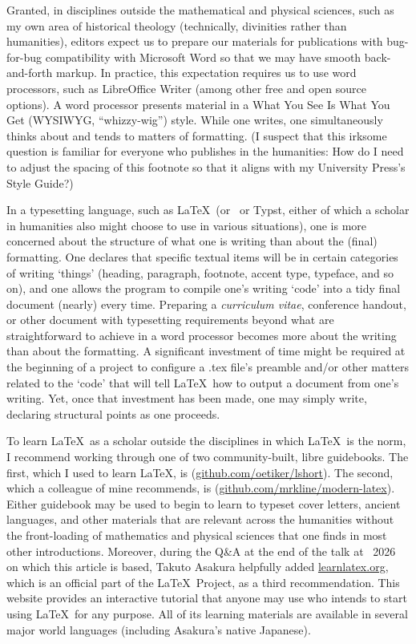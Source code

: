 \documentclass{ltugboat}
\begin{document}
Granted, in disciplines outside the mathematical and physical sciences, such as my own area of historical theology (technically, divinities rather than humanities), editors expect us to prepare our materials for publications with bug-for-bug compatibility with Microsoft Word so that we may have smooth back-and-forth markup. In practice, this expectation requires us to use word processors, such as LibreOffice Writer (among other free and open source options). A word processor presents material in a What You See Is What You Get (WYSIWYG, ``whizzy-wig'') style. While one writes, one simultaneously thinks about and tends to matters of formatting. (I suspect that this irksome question is familiar for everyone who publishes in the humanities: How do I need to adjust the spacing of this footnote so that it aligns with my University Press's Style Guide?)

In a typesetting language, such as \LaTeX\ (or \ConTeXt\ or Typst, either of which a scholar in humanities also might choose to use in various situations), one is more concerned about the structure of what one is writing than about the (final) formatting. One declares that specific textual items will be in certain categories of writing `things' (heading, paragraph, footnote, accent type, typeface, and so on), and one allows the program to compile one's writing `code' into a tidy final document \Dash (nearly) every time. Preparing a \textit{curriculum vitae}, conference handout, or other document with typesetting requirements beyond what are straightforward to achieve in a word processor becomes more about the writing than about the formatting. A significant investment of time might be required at the beginning of a project to configure a .tex file's preamble and/or other matters related to the `code' that will tell \LaTeX\ how to output a document from one's writing. Yet, once that investment has been made, one may simply write, declaring structural points as one proceeds.

To learn \LaTeX\ as a scholar outside the disciplines in which \LaTeX\ is the norm, I recommend working through one of two community-built, libre guidebooks. The first, which I used to learn \LaTeX, is  (\url{github.com/oetiker/lshort}). The second, which a colleague of mine recommends, is  (\url{github.com/mrkline/modern-latex}). Either guidebook may be used to begin to learn to typeset cover letters, ancient languages, and other materials that are relevant across the humanities \Dash without the front-loading of mathematics and physical sciences that one finds in most other introductions. Moreover, during the Q\&A at the end of the talk at \TUG\ 2026 on which this article is based, Takuto Asakura helpfully added \url{learnlatex.org}, which is an official part of the \LaTeX\ Project, as a third recommendation. This website provides an interactive tutorial that anyone may use who intends to start using \LaTeX\ for any purpose. All of its learning materials are available in several major world languages (including Asakura's native Japanese).
\end{document}
